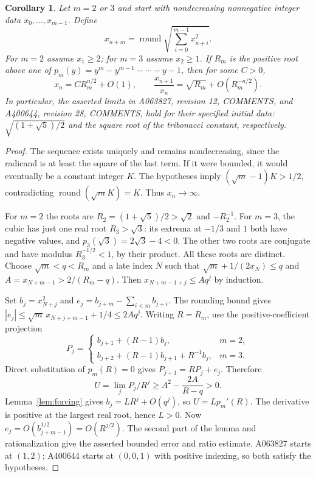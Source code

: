 \documentclass[11pt]{article}
\newtheorem{corollary}[theorem]{Corollary}
\begin{document}
\begin{corollary}\label{cor:norm}
Let $m=2$ or $3$ and start with nondecreasing nonnegative integer data
$x_0,\ldots,x_{m-1}$. Define
\[
 x_{n+m}=\operatorname{round}\sqrt{\sum_{i=0}^{m-1}x_{n+i}^2}.
\]
For $m=2$ assume $x_1\ge2$; for $m=3$ assume $x_2\ge1$.
If $R_m$ is the positive root above one of
$p_m(y)=y^m-y^{m-1}-\cdots-y-1$, then for some $C>0$,
\[
 x_n=C R_m^{n/2}+O(1),\qquad
 \frac{x_{n+1}}{x_n}=\sqrt{R_m}+O(R_m^{-n/2}).
\]
In particular, the asserted limits in A063827, revision 12, COMMENTS,
and A400644, revision 28, COMMENTS, hold for their specified initial
data: $\sqrt{(1+\sqrt5)/2}$ and the square root of the tribonacci
constant, respectively.
\end{corollary}
\begin{proof}
The sequence exists uniquely and remains nondecreasing, since the
radicand is at least the square of the last term. If it were bounded,
it would eventually be a constant integer $K$. The hypotheses imply
$(\sqrt m-1)K>1/2$, contradicting
$\operatorname{round}(\sqrt m K)=K$. Thus $x_n\to\infty$.

For $m=2$ the roots are $R_2=(1+\sqrt5)/2>\sqrt2$ and $-R_2^{-1}$.
For $m=3$, the cubic has just one real root $R_3>\sqrt3$:
its extrema at $-1/3$ and $1$ both have negative values, and
$p_3(\sqrt3)=2\sqrt3-4<0$. The other two roots are conjugate and
have modulus $R_3^{-1/2}<1$, by their product. All these roots are
distinct. Choose $\sqrt m<q<R_m$ and a late index $N$ such that
$\sqrt m+1/(2x_N)\le q$ and
$A=x_{N+m-1}>2/(R_m-q)$. Then
$x_{N+m-1+j}\le A q^j$ by induction.

Set $b_j=x_{N+j}^2$ and
$e_j=b_{j+m}-\sum_{i<m}b_{j+i}$.
The rounding bound gives
$|e_j|\le\sqrt m\,x_{N+j+m-1}+1/4\le2Aq^j$.
Writing $R=R_m$, use the positive-coefficient projection
\[
 P_j=\begin{cases}
 b_{j+1}+(R-1)b_j,&m=2,\\
 b_{j+2}+(R-1)b_{j+1}+R^{-1}b_j,&m=3.
 \end{cases}
\]
Direct substitution of $p_m(R)=0$ gives $P_{j+1}=RP_j+e_j$.
Therefore
\[
 U=\lim_j P_j/R^j
 \ge A^2-\frac{2A}{R-q}>0.
\]
Lemma~\ref{lem:forcing} gives $b_j=L R^j+O(q^j)$, so
$U=L p_m'(R)$. The derivative is positive at the largest real root,
hence $L>0$. Now $e_j=O(b_{j+m-1}^{1/2})=O(R^{j/2})$.
The second part of the lemma and rationalization give the asserted
bounded error and ratio estimate. A063827 starts at $(1,2)$;
A400644 starts at $(0,0,1)$ with positive indexing, so both satisfy
the hypotheses.
\end{proof}
\end{document}
